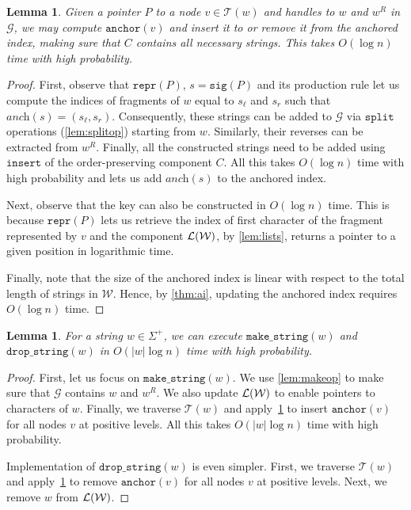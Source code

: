 \documentclass[a4paper]{article}
\newtheorem{lemma}[theorem]{Lemma}
\theoremstyle{remark}
\newcommand{\makeop}{\mathtt{make\_string}}
\newcommand{\dropop}{\mathtt{drop\_string}}
\newcommand{\splitop}{\mathtt{split}}
\newcommand{\grammar}{\mathcal{G}}
\newcommand{\sanch}{\textit{anch}}
\newcommand{\stree}{\mathcal{T}}
\newcommand{\coll}{\mathcal{W}}
\newcommand{\itrepr}{\mathtt{repr}}
\newcommand{\itanch}{\mathtt{anchor}}
\newcommand{\itsig}{\mathtt{sig}}
\newcommand{\insertop}{\mathtt{insert}}
\begin{document}
\begin{lemma}\label{lem:update_ai}
Given a pointer $P$ to a node $v\in \stree(w)$ and handles to $w$ and $w^R$ in $\grammar$,
we may compute $\itanch(v)$ and insert it to or remove it from the anchored index, making sure that $C$ contains all necessary strings.
This takes $O(\log n)$ time with high probability.
\end{lemma}
\begin{proof}
First, observe that $\itrepr(P)$, $s=\itsig(P)$ and its production
rule let us compute the indices of fragments of $w$ equal to
$s_\ell$ and $s_r$ such that $\sanch(s)=(s_\ell,s_r)$.
Consequently, these strings can be added to $\grammar$ via $\splitop$ operations (\cref{lem:splitop}) starting from $w$.
Similarly, their reverses can be extracted from $w^R$.
Finally, all the constructed strings need to be added using $\insertop$ of the order-preserving component $C$.
All this takes $O(\log n)$ time with high probability and lets us add $\sanch(s)$ to the anchored index.

Next, observe that the key can also be constructed in $O(\log n)$ time. This is because $\itrepr(P)$ lets us retrieve
the index of first character of the fragment represented by $v$ and the component $\lists(\coll)$, by \cref{lem:lists},
returns a pointer to a given position in logarithmic time.

Finally, note that the size of the anchored index is linear with respect to the total length of strings in $\coll$.
Hence, by \cref{thm:ai}, updating the anchored index requires $O(\log n)$ time.
\end{proof}

\begin{lemma}\label{lem:makeopn}
For a string $w\in \Sigma^+$, we can execute $\makeop(w)$ and $\dropop(w)$ in $O(|w| \log n)$ time
with high probability.
\end{lemma}

\begin{proof}
First, let us focus on $\makeop(w)$. We use \cref{lem:makeop} to make sure that $\grammar$ contains $w$ and $w^R$.
We also update $\lists(\coll)$ to enable pointers to characters of $w$.
Finally, we traverse $\stree(w)$ and apply~\cref{lem:update_ai} to insert $\itanch(v)$ for all nodes $v$ at positive levels.
All this takes $O(|w|\log n)$ time with high probability.

Implementation of $\dropop(w)$ is even simpler. First, we traverse $\stree(w)$  and apply~\cref{lem:update_ai} to remove $\itanch(v)$
for all nodes $v$ at positive levels. Next, we remove $w$ from $\lists(\coll)$.
\end{proof}
\end{document}

